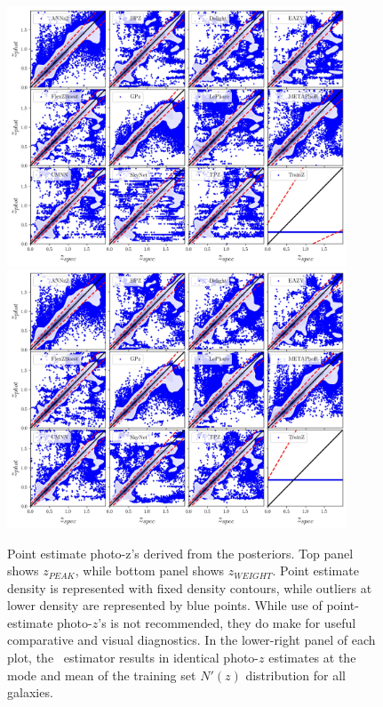 \begin{figure}
\centering
\includegraphics[width=0.9\textwidth]{fig/ZPEAK_szpz_threecolumn_12codes_navy.jpg}
\includegraphics[width=0.9\textwidth]{fig/ZWEIGHT_szpz_threecolumn_12codes_navy.jpg}
\caption{Point estimate photo-z's derived from the posteriors. Top panel shows $z_{PEAK}$, while bottom panel shows $z_{WEIGHT}$.  Point estimate density is represented with fixed density contours, while outliers at lower density are represented by blue points.  While use of point-estimate photo-$z$'s is not recommended, they do make for useful comparative and visual diagnostics.  In the lower-right panel of each plot, the \trainz\ estimator results in identical photo-$z$ estimates at the mode and mean of the training set $N'(z)$ distribution for all galaxies.} \label{fig:pz_pointestimates}
\end{figure}


